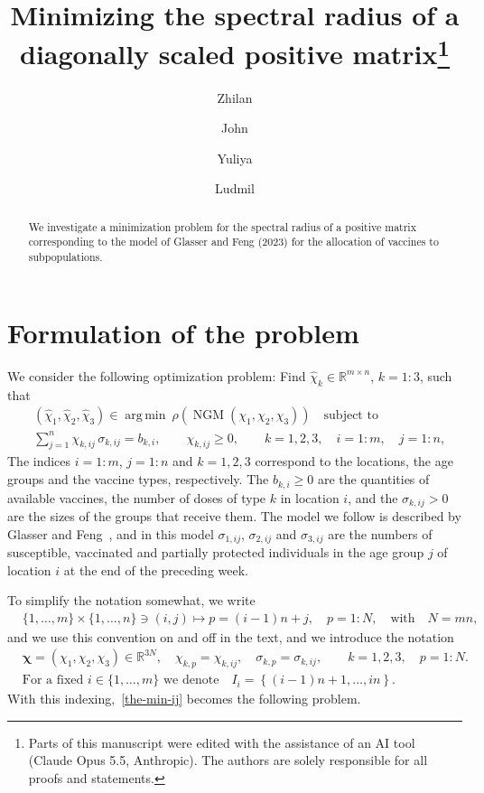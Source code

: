 \documentclass[11pt]{article}
\title{Minimizing the spectral radius of a diagonally scaled positive matrix\thanks{Parts of this manuscript were edited with the assistance of an AI tool (Claude Opus 5.5, Anthropic). The authors are solely responsible for all proofs and statements.}}
\author{Zhilan \and John \and Yuliya \and Ludmil}
\date{}
\theoremstyle{plain}
\theoremstyle{definition}
\theoremstyle{remark}
\numberwithin{equation}{section}
\numberwithin{figure}{section}
\numberwithin{table}{section}
\numberwithin{algorithm}{section}
\begin{document}
\maketitle

\begin{abstract}
    We investigate a minimization problem for the spectral radius of a positive matrix corresponding to the model of Glasser and Feng (2023) for the allocation of vaccines to subpopulations.
\end{abstract}

\tableofcontents

\section{Formulation of the problem}\label{sec-ngm}


We consider the following optimization problem: Find $\widehat\chi_k\in\mathbb{R}^{m\times n}$, $k=1:3$, such that
\begin{equation}\label{the-min-ij}
\begin{aligned}
&\left(\widehat\chi_1,\widehat\chi_2,\widehat\chi_3\right)
\in\operatorname*{arg\,min}\ \rho\left(\operatorname{NGM}(\chi_1,\chi_2,\chi_3)\right)
\quad\mbox{subject to}\\
&\sum_{j=1}^{n}\chi_{k,ij}\,\sigma_{k,ij}=b_{k,i},\qquad \chi_{k,ij}\ge 0,
\qquad k=1,2,3,\quad i=1:m,\quad j=1:n ,
\end{aligned}
\end{equation}
The indices $i=1:m$, $j=1:n$ and $k=1,2,3$ correspond to the locations, the age groups and the vaccine types, respectively.
The $b_{k,i}\ge 0$ are the quantities of available vaccines, the number of
doses of type $k$ in location $i$, and the $\sigma_{k,ij}>0$ are the sizes of
the groups that receive them. The model we follow is described by Glasser
and Feng~\cite{JZh}, and in this model $\sigma_{1,ij}$,
$\sigma_{2,ij}$ and $\sigma_{3,ij}$ are the numbers of susceptible, vaccinated
and partially protected individuals in the age group $j$ of location $i$ at
the end of the preceding week.

To simplify the notation somewhat, we write
\begin{equation}\label{flat-index}
\begin{aligned}
&\{1,\ldots,m\}\times\{1,\ldots,n\}\ni (i,j)\mapsto p=(i-1)n+j,\quad p=1:N, \quad\mbox{with}\quad N=mn,
\end{aligned}
\end{equation}
and we use this convention on and off in the text, and we introduce the notation
\begin{equation}\label{flat}
\begin{aligned}
&\bm\chi=(\chi_1,\chi_2,\chi_3)\in\mathbb{R}^{3N},\quad \chi_{k,p}=\chi_{k,ij},\quad
\sigma_{k,p}=\sigma_{k,ij},\qquad k=1,2,3,\quad p=1:N.\\
&\mbox{For a fixed $i\in\{1,\ldots,m\}$ we denote}\quad I_i=\left\{(i-1)n+1,\ldots,in\right\}.
\end{aligned}
\end{equation}
With this indexing,~\eqref{the-min-ij} becomes the following problem.
\end{document}
